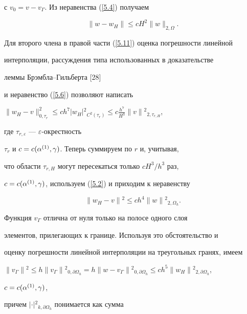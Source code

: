 \begin{pf}
\begin{equation}
\end{equation}


с $v_0=v-v_\Gamma$. Из неравенства (\ref{5.4}) получаем


\begin{equation}\label{5.12}


\|w-w_H\|\le c H^2\|w\|_{{2,\Omega}}.


\end{equation}


Для второго члена в правой части (\ref{5.11}) оценка погрешности линейной


интерполяции, рассуждения типа использованных в доказательстве


леммы Брэмбла--Гильберта [28]


и неравенство (\ref{5.6}) позволяют написать


$\|w_H-v\|^{2}_{{0,\tau_r}}\le ch^7|w_H|{^2}_{{C^2(\tau_r)}}\le


c\frac{h^7}{H^3}\|v\|{^2}_{{2,\tau_{r,H}}}$,


где $\tau_{r,\varepsilon}$ --- $\varepsilon$-окрестность


$\tau_r$ и $c=c(\alpha^{(1)},\gamma)$. Теперь суммируем по $r$ и, учитывая,


что области $\tau_{r,H}$ могут пересекаться только $cH^3/h^3$ раз,


$c=c(\alpha^{(1)},\gamma)$, используем (\ref{5.2}) и приходим к неравенству


\begin{equation}\label{5.13}


\|w_H-v\|{^2}\le


ch^4\|w\|{^2}_{{2,\Omega_h}}.


\end{equation}





Функция $v_\Gamma$ отлична от нуля только на полосе одного слоя


элементов, прилегающих к границе. Используя это обстоятельство и


оценку погрешности линейной интерполяции на треугольных гранях, имеем


$\|v_\Gamma\|{^2}\le


h\|v_\Gamma\|{^2}_{{0,\partial\Omega_h}}=h\|w-v_\Gamma\|{^2}_{{0,\partial


\Omega_h}}\le ch^5\|w_H\|{^2}_{{2,\partial\Omega_h}}$,


$c=c(\alpha^{(1)},\gamma)$,


причем $|\cdot|{^2}_{{k,\partial\Omega_h}}$ понимается как сумма



\end{pf}
